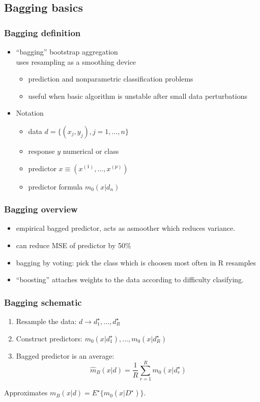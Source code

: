 \documentclass[bigger]{beamer}
\begin{document}
\subsection{Bagging basics}
\label{sec-1-2}
\begin{frame}
\frametitle{Bagging definition}
\label{sec-1-2-1}
\begin{itemize}

\item ``bagging'' bootstrap aggregation\\
\label{sec-1-2-1-1}%
uses resampling as a smoothing device
\begin{itemize}
\item prediction and nonparametric classification problems
\item useful when basic algorithm is unstable after small data perturbations
\end{itemize}


\item Notation\\
\label{sec-1-2-1-2}%
\begin{itemize}
\item data $d = \{(x_j,y_j),j=1,\ldots,n\}$
\item response $y$ numerical or class
\item predictor $x\equiv (x^{(1)},\ldots,x^{(p)})$
\item predictor formula $m_0(x|d_n)$
\end{itemize}

\end{itemize} %
\end{frame}
\begin{frame}
\frametitle{Bagging overview}
\label{sec-1-2-2}


\begin{itemize}
\item empirical bagged predictor, acts as asmoother which reduces
  variance.
\item can reduce MSE of predictor by 50\%
\item bagging by voting: pick the class which is choosen most often in R
  resamples
\item ``boosting'' attaches weights to the data according to difficulty clasifying.
\end{itemize}
\end{frame}
\begin{frame}
\frametitle{Bagging schematic}
\label{sec-1-2-3}


\begin{enumerate}
\item Resample the data: $d \rightarrow d^{\star}_1,\ldots,d^{\star}_R$
\item Construct predictors: $m_0(x|d^{\star}_1),\ldots,m_0(x|d^{\star}_R)$
\item Bagged predictor is an average: $$\hat{m}_B(x|d) = \frac{1}{R}
   \sum_{r=1}^{R}m_0(x|d^{\star}_r)$$
\end{enumerate}

Approximates $m_B(x|d) = E^{\star}\{m_0(x|D^{\star})\}$.
\end{frame}
\end{document}

